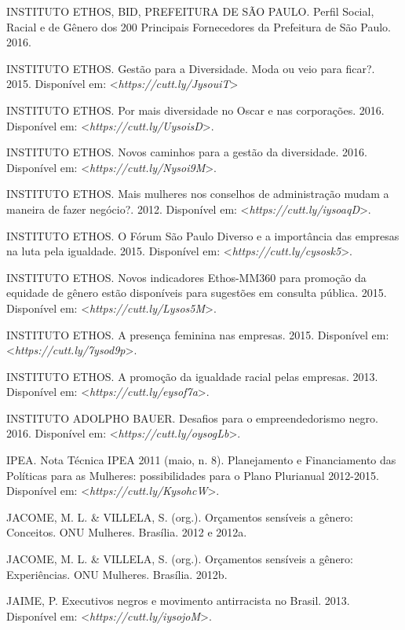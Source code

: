 \begin{Parskip}
INSTITUTO ETHOS, BID, PREFEITURA DE SÃO PAULO. Perfil Social, Racial e
de Gênero dos 200 Principais Fornecedores da Prefeitura de São Paulo.
2016.

INSTITUTO ETHOS. Gestão para a Diversidade. Moda ou veio para ficar?.
2015.
Disponível em: \textless{}\emph{https://cutt.ly/JysouiT}\textgreater{}

INSTITUTO ETHOS. Por mais diversidade no Oscar e nas corporações. 2016.
Disponível em: \textless{}\emph{https://cutt.ly/UysoisD}\textgreater{}.

INSTITUTO ETHOS. Novos caminhos para a gestão da diversidade. 2016.
Disponível em: \textless{}\emph{https://cutt.ly/Nysoi9M}\textgreater{}.

INSTITUTO ETHOS. Mais mulheres nos conselhos de administração mudam a
maneira de fazer negócio?. 2012.
Disponível em: \textless{}\emph{https://cutt.ly/iysoaqD}\textgreater{}.

INSTITUTO ETHOS. O Fórum São Paulo Diverso e a importância das empresas
na luta pela igualdade. 2015.
Disponível em: \textless{}\emph{https://cutt.ly/cysosk5}\textgreater{}.

INSTITUTO ETHOS. Novos indicadores Ethos-MM360 para promoção da equidade
de gênero estão disponíveis para sugestões em consulta pública. 2015.
Disponível em: \textless{}\emph{https://cutt.ly/Lysos5M}\textgreater{}.

INSTITUTO ETHOS. A presença feminina nas empresas. 2015.
Disponível em: \textless{}\emph{https://cutt.ly/7ysod9p}\textgreater{}.

INSTITUTO ETHOS. A promoção da igualdade racial pelas empresas. 2013.
Disponível em: \textless{}\emph{https://cutt.ly/eysof7a}\textgreater{}.

INSTITUTO ADOLPHO BAUER. Desafios para o empreendedorismo negro. 2016.
Disponível em: \textless{}\emph{https://cutt.ly/oysogLb}\textgreater{}.

IPEA. Nota Técnica IPEA 2011 (maio, n. 8). Planejamento e Financiamento
das Políticas para as Mulheres: possibilidades para o Plano Plurianual
2012-2015.
Disponível em: \textless{}\emph{https://cutt.ly/KysohcW}\textgreater{}.

JACOME, M. L. \& VILLELA, S. (org.). Orçamentos sensíveis a gênero:
Conceitos. ONU Mulheres. Brasília. 2012 e 2012a.

JACOME, M. L. \& VILLELA, S. (org.). Orçamentos sensíveis a gênero:
Experiências. ONU Mulheres. Brasília. 2012b.

JAIME, P. Executivos negros e movimento antirracista no Brasil. 2013.
Disponível em: \textless{}\emph{https://cutt.ly/iysojoM}\textgreater{}.


\end{Parskip}
